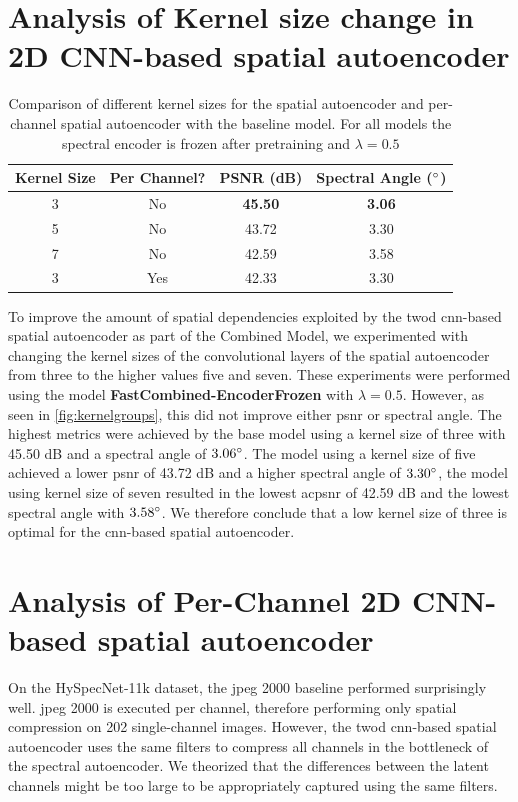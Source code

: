 \section{Analysis of Kernel size change in 2D CNN-based spatial autoencoder}
\begin{table}
\centering
\begin{tabular}{|c|c|c|c|}
\hline
Kernel Size & Per Channel? & PSNR (dB) & Spectral Angle ($\degree$) \\
\hline\hline
3 & No & \textbf{45.50} & \textbf{3.06} \\
\hline
5 & No & 43.72 & 3.30 \\
\hline
7 & No & 42.59 & 3.58 \\
\hline
3 & Yes & 42.33 & 3.30 \\
\hline
\end{tabular}
\caption{Comparison of different kernel sizes for the spatial autoencoder and per-channel spatial autoencoder with the baseline model. For all models the spectral encoder is frozen after pretraining and $\lambda = 0.5$}
\label{fig:kernelgroups}
\end{table}

To improve the amount of spatial dependencies exploited by the \ac{twod} \ac{cnn}-based spatial autoencoder as part of the Combined Model, we experimented with changing the kernel sizes of the convolutional layers of the spatial autoencoder from three to the higher values five and seven. These experiments were performed using the model \textbf{FastCombined-EncoderFrozen} with $\lambda=0.5$. However, as seen in \autoref{fig:kernelgroups}, this did not improve either \ac{psnr} or spectral angle. The highest metrics were achieved by the base model using a kernel size of three with 45.50 dB and a spectral angle of $3.06 \degree$. The model using a kernel size of five achieved a lower \ac{psnr} of 43.72 dB and a higher spectral angle of $3.30 \degree$, the model using kernel size of seven resulted in the lowest ac{psnr} of 42.59 dB and the lowest spectral angle with $3.58 \degree$. We therefore conclude that a low kernel size of three is optimal for the \ac{cnn}-based spatial autoencoder.

\section{Analysis of Per-Channel 2D CNN-based spatial autoencoder}
On the HySpecNet-11k dataset, the \ac{jpeg} 2000 baseline performed surprisingly well. \Ac{jpeg} 2000 is executed per channel, therefore performing only spatial compression on 202 single-channel images. However, the \ac{twod} \ac{cnn}-based spatial autoencoder uses the same filters to compress all channels in the bottleneck of the spectral autoencoder. We theorized that the differences between the latent channels might be too large to be appropriately captured using the same filters. 

